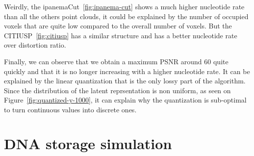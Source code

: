 Weirdly, the ipanemaCut~\ref{fig:ipanema-cut} shows a much higher nucleotide rate than all the others point clouds, it could be explained by the number of occupied voxels that are quite low compared to the overall number of voxels. But the CITIUSP~\ref{fig:citiusp} has a similar structure and has a better nucleotide rate over distortion ratio.

Finally, we can observe that we obtain a maximum PSNR around $60$ quite quickly and that it is no longer increasing with a higher nucleotide rate. It can be explained by the linear quantization that is the only lossy part of the algorithm. Since the distribution of the latent reprsentation is non uniform, as seen on Figure~\ref{fig:quantized-y-1000}, it can explain why the quantization is sub-optimal to turn continuous values into discrete ones.

\section{DNA storage simulation}

\tocontinue{}
